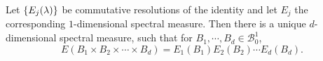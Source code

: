 \documentclass[a4paper,12pt]{article}
\begin{document}
\begin{prop}
    Let $\left\{E_j(\lambda)\right\}$ be commutative resolutions of the identity and let $E_j$ the corresponding $1$-dimensional spectral measure. Then there is a unique $d$-dimensional spectral measure, such that for $B_1,\cdots,B_d \in \mathcal{B}^1_0$,
    \begin{equation*}
        E\left(B_1 \times B_2 \times \cdots \times B_d\right)=E_1\left(B_1\right) E_2\left(B_2\right) \cdots E_d\left(B_d\right).
    \end{equation*}
\end{prop}



















%
\newpage
\printbibliography
\end{document}
